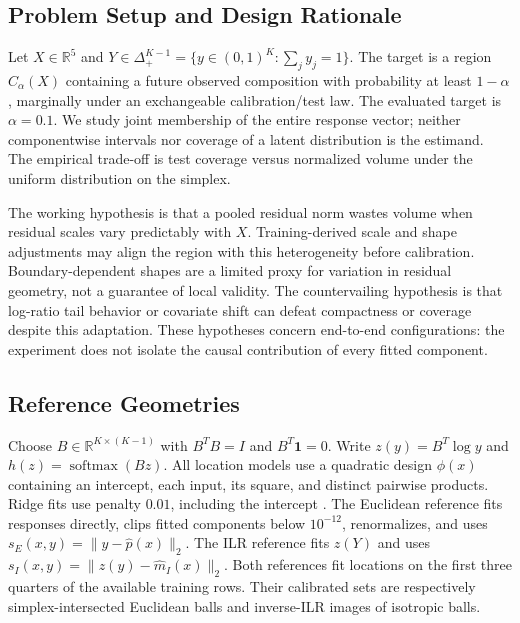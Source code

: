 \documentclass{article}
\newcommand{\simplex}{\Delta^{K-1}_{+}}
\newcommand{\R}{\mathbb{R}}
\begin{document}
\subsection{Problem Setup and Design Rationale}
Let $X\in\R^5$ and $Y\in\simplex=\{y\in(0,1)^K:\sum_j y_j=1\}$. The target is a region $C_\alpha(X)$ containing a future observed composition with probability at least $1-\alpha$, marginally under an exchangeable calibration/test law. The evaluated target is $\alpha=0.1$. We study joint membership of the entire response vector; neither componentwise intervals nor coverage of a latent distribution is the estimand. The empirical trade-off is test coverage versus normalized volume under the uniform distribution on the simplex.

The working hypothesis is that a pooled residual norm wastes volume when residual scales vary predictably with $X$. Training-derived scale and shape adjustments may align the region with this heterogeneity before calibration. Boundary-dependent shapes are a limited proxy for variation in residual geometry, not a guarantee of local validity. The countervailing hypothesis is that log-ratio tail behavior or covariate shift can defeat compactness or coverage despite this adaptation. These hypotheses concern end-to-end configurations: the experiment does not isolate the causal contribution of every fitted component.

\subsection{Reference Geometries}
Choose $B\in\R^{K\times(K-1)}$ with $B^TB=I$ and $B^T\mathbf{1}=0$. Write $z(y)=B^T\log y$ and $h(z)=\operatorname{softmax}(Bz)$. All location models use a quadratic design $\phi(x)$ containing an intercept, each input, its square, and distinct pairwise products. Ridge fits use penalty $0.01$, including the intercept \citep{HoerlKennard1970}. The Euclidean reference fits responses directly, clips fitted components below $10^{-12}$, renormalizes, and uses $s_E(x,y)=\|y-\widehat p(x)\|_2$. The ILR reference fits $z(Y)$ and uses $s_I(x,y)=\|z(y)-\widehat m_I(x)\|_2$. Both references fit locations on the first three quarters of the available training rows. Their calibrated sets are respectively simplex-intersected Euclidean balls and inverse-ILR images of isotropic balls.
\end{document}
